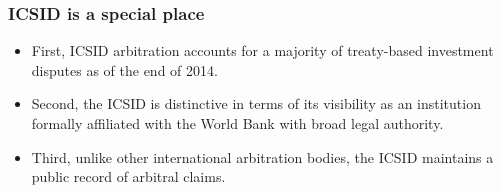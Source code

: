 \documentclass[10pt]{beamer}
\begin{document}
\begin{frame}
\frametitle{ICSID is a special place}


\begin{itemize}
	\item First, ICSID arbitration accounts for a majority of treaty-based investment disputes as of the end of 2014.
	\item  Second, the ICSID is distinctive in terms of its visibility as an institution formally affiliated with the World Bank with broad legal authority. 
	\item Third, unlike other international arbitration bodies, the ICSID maintains a public record of arbitral claims.
\end{itemize}

\end{frame}
\end{document}
